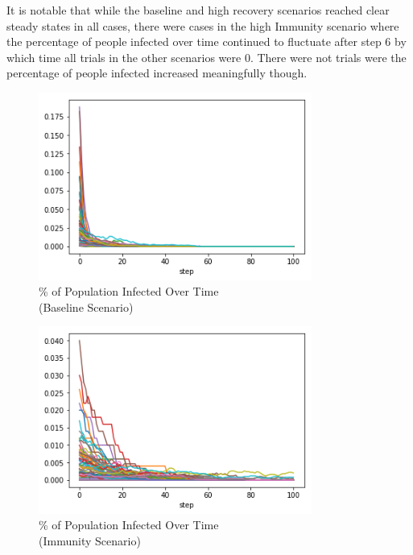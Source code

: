 \documentclass[11pt]{article} %
\begin{document}
It is notable that while the baseline and high recovery scenarios reached clear steady states in all cases, there were cases in the high Immunity scenario where the percentage of people infected over time continued to fluctuate after step 6 by which time all trials in the other scenarios were 0. There were not trials were the percentage of people infected increased meaningfully though. 




\begin{figure}
\centering
\includegraphics[width=0.8\textwidth]{baseline_steady_state}
\caption{\% of Population Infected Over Time \\ (Baseline Scenario)}
\end{figure}


\begin{figure}
\centering
\includegraphics[width=0.8\textwidth]{immunity_steady_state}
\caption{\% of Population Infected Over Time \\ (Immunity Scenario)}
\end{figure}
\end{document}
